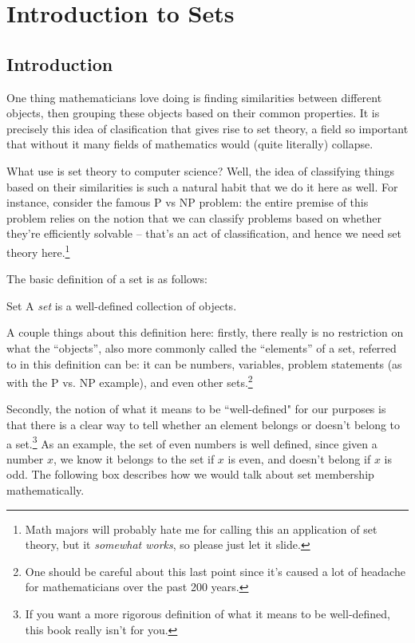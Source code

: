 \chapter{Introduction to Sets}
\section{Introduction}
One thing mathematicians love doing is finding similarities between different objects, then 
grouping these objects based on their common properties. It is precisely this idea of clasification that 
gives rise to set theory, a field so important that without it many fields of mathematics 
would (quite literally) collapse. 

What use is set theory to computer science? Well, the idea of classifying things based on their 
similarities is such a natural habit that we do it here as well. For instance, consider the 
famous P vs NP problem: the entire premise of this problem relies on the notion that we can 
classify problems based on whether they're efficiently solvable -- that's an act of classification, 
and hence we need set theory here.\footnote{Math majors will probably hate me for calling this an application of 
set theory, but it \textit{somewhat works}, so please just let it slide.}

The basic definition of a set is as follows:
\begin{definition}{Set}{}
	A \textit{set} is a well-defined collection of objects. 
\end{definition}
A couple things about this definition here: firstly, there really is no restriction on what the ``objects'', 
also more commonly called the ``elements'' of a set, referred
to in this definition can be: it can be numbers, variables, problem statements (as with the P vs. NP 
example), and even other sets.\footnote{One should be careful about this last point since it's caused 
a lot of headache for mathematicians over the past 200 years.} 

Secondly, the notion of what it means to be ``well-defined" for our purposes 
is that there is a clear way to tell whether an element 
belongs or doesn't belong to a set.\footnote{If you want a more rigorous definition 
of what it means to be well-defined, this book really isn't for you.} As an example, the set of even numbers is 
well defined, since given a number \( x \), we know it belongs to the set if \( x \) is even, and doesn't belong 
if \( x \) is odd. The following box describes how we would talk about set membership mathematically. 


